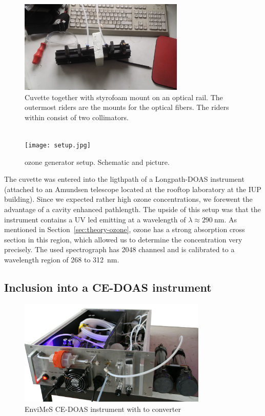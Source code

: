 \begin{figure}[htbp]
  \centering
  \includegraphics[width=0.7\textwidth]{images/cuvette.jpg}
  \caption{Cuvette together with styrofoam mount on an optical
    rail. The outermost riders are the mounts for the optical
    fibers. The riders within consist of two collimators.}
  \label{fig:cuvette}
\end{figure}

\begin{figure}[htbp]
  \centering
  {
  \def\svgwidth{0.9\linewidth}
  
  }
  \phantom{h}\\
  \vspace{2cm}
  \texttt{[image: setup.jpg]}
  \caption{ozone generator setup. Schematic and picture.}
  \label{fig:setup}
\end{figure}

The cuvette was entered into the ligthpath of a Longpath-DOAS
instrument (attached to an Amundsen telescope located at the rooftop
laboratory at the IUP building). Since we expected rather high ozone
concentrations, we forewent the advantage of a cavity enhanced
pathlength. The upside of this setup was that the instrument contains
a UV led emitting at a wavelength of
$\lambda \approx \SI{290}{\nano\meter}$. As mentioned in
Section~\ref{sec:theory-ozone}, ozone has a strong absorption cross
section in this region, which allowed us to determine the
concentration very precisely. The used spectrograph has 2048 channesl
and is calibrated to a wavelength region of \num{268} to
\SI{312}{\nano\meter}.

\subsection{Inclusion into a CE-DOAS instrument}
\label{sec:inclusion}

\begin{figure}[htbp]
  \centering
  \includegraphics[width=0.8\textwidth]{images/InstrumentEdited_small.jpg}
  \caption{EnviMeS CE-DOAS instrument with  to 
    converter}
  \label{fig:envimes}
\end{figure}

